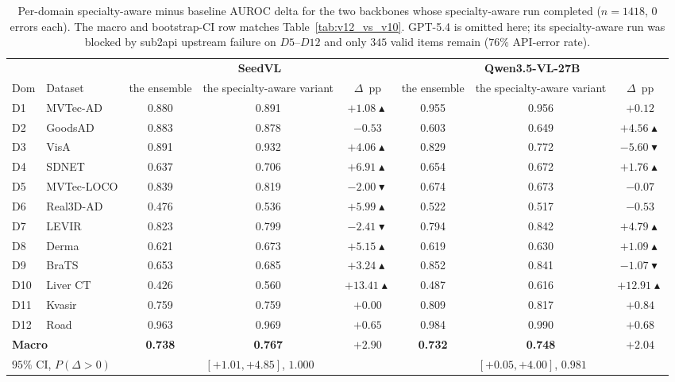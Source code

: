 \begin{table}[h]
\centering
\caption{Per-domain specialty-aware minus baseline AUROC delta for the two backbones whose specialty-aware run completed ($n{=}1418$, $0$ errors each). The macro and bootstrap-CI row matches Table~\ref{tab:v12_vs_v10}. GPT-5.4 is omitted here; its specialty-aware run was blocked by sub2api upstream failure on $D5$--$D12$ and only $345$ valid items remain ($76\%$ API-error rate).}
\label{tab:perdomain_v12_delta}
\small
\setlength{\tabcolsep}{4pt}
\begin{tabular}{ll|ccc|ccc}
\toprule
& & \multicolumn{3}{c|}{\textbf{SeedVL}} & \multicolumn{3}{c}{\textbf{Qwen3.5-VL-27B}} \\
Dom & Dataset &  the ensemble & the specialty-aware variant & $\Delta$~pp &  the ensemble & the specialty-aware variant & $\Delta$~pp \\
\midrule
D1  & MVTec-AD     & 0.880 & 0.891 & $+1.08\blacktriangle$  & 0.955 & 0.956 & $+0.12$ \\
D2  & GoodsAD      & 0.883 & 0.878 & $-0.53$               & 0.603 & 0.649 & $+4.56\blacktriangle$ \\
D3  & VisA         & 0.891 & 0.932 & $+4.06\blacktriangle$  & 0.829 & 0.772 & $-5.60\blacktriangledown$ \\
D4  & SDNET        & 0.637 & 0.706 & $+6.91\blacktriangle$  & 0.654 & 0.672 & $+1.76\blacktriangle$ \\
D5  & MVTec-LOCO   & 0.839 & 0.819 & $-2.00\blacktriangledown$ & 0.674 & 0.673 & $-0.07$ \\
D6  & Real3D-AD    & 0.476 & 0.536 & $+5.99\blacktriangle$  & 0.522 & 0.517 & $-0.53$ \\
D7  & LEVIR        & 0.823 & 0.799 & $-2.41\blacktriangledown$ & 0.794 & 0.842 & $+4.79\blacktriangle$ \\
D8  & Derma        & 0.621 & 0.673 & $+5.15\blacktriangle$  & 0.619 & 0.630 & $+1.09\blacktriangle$ \\
D9  & BraTS        & 0.653 & 0.685 & $+3.24\blacktriangle$  & 0.852 & 0.841 & $-1.07\blacktriangledown$ \\
D10 & Liver CT     & 0.426 & 0.560 & $\mathbf{+13.41\blacktriangle}$ & 0.487 & 0.616 & $\mathbf{+12.91\blacktriangle}$ \\
D11 & Kvasir       & 0.759 & 0.759 & $+0.00$               & 0.809 & 0.817 & $+0.84$ \\
D12 & Road         & 0.963 & 0.969 & $+0.65$               & 0.984 & 0.990 & $+0.68$ \\
\midrule
\multicolumn{2}{l|}{\textbf{Macro}} & \textbf{0.738} & \textbf{0.767} & $\mathbf{+2.90}$ & \textbf{0.732} & \textbf{0.748} & $\mathbf{+2.04}$ \\
\multicolumn{2}{l|}{$95\%$ CI, $P(\Delta{>}0)$}
                                    & \multicolumn{3}{c|}{$[+1.01, +4.85]$, $1.000$}
                                    & \multicolumn{3}{c}{$[+0.05, +4.00]$, $0.981$} \\
\bottomrule
\end{tabular}
\end{table}

